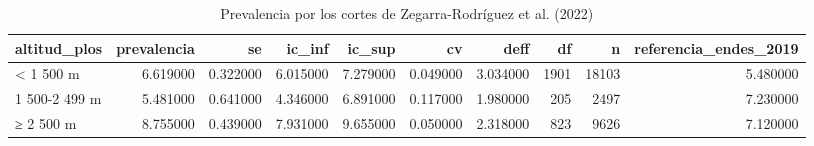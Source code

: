 \begin{table}[htbp]
\caption{Prevalencia por los cortes de Zegarra-Rodríguez et al. (2022)}
\label{tab:tabla_34_altitud_cortes_literatura}
\begin{tabular}{lrrrrrrrrr}
\toprule
altitud\_plos & prevalencia & se & ic\_inf & ic\_sup & cv & deff & df & n & referencia\_endes\_2019 \\
\midrule
< 1 500 m & 6.619000 & 0.322000 & 6.015000 & 7.279000 & 0.049000 & 3.034000 & 1901 & 18103 & 5.480000 \\
1 500-2 499 m & 5.481000 & 0.641000 & 4.346000 & 6.891000 & 0.117000 & 1.980000 & 205 & 2497 & 7.230000 \\
≥ 2 500 m & 8.755000 & 0.439000 & 7.931000 & 9.655000 & 0.050000 & 2.318000 & 823 & 9626 & 7.120000 \\
\bottomrule
\end{tabular}
\end{table}
